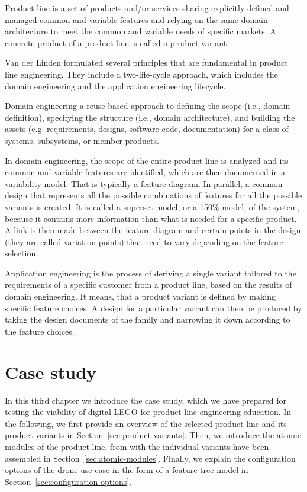 \documentclass[sigconf,review]{acmart}
\begin{document}
Product line is a set of products and/or services sharing explicitly defined and managed common and variable features and relying on the same domain architecture to meet the common and variable needs of specific markets.
A concrete product of a product line is called a product variant.

Van der Linden formulated several principles that are fundamental in product line engineering. They include a two-life-cycle approach, which includes the domain engineering and the application engineering lifecycle.

Domain engineering a reuse-based approach to defining the scope (i.e., domain definition), specifying the structure (i.e., domain architecture), and building the assets (e.g. requirements, designs, software code, documentation) for a class of systems, subsystems, or member products.

In domain engineering, the scope of the entire product line is analyzed and its common and variable features are identified, which are then documented in a variability model. That is typically a feature diagram.
In parallel, a common design that represents all the possible combinations of features for all the possible variants is created. It is called a superset model, or a 150\% model, of the system, because it contains more information than what is needed for a specific product.
A link is then made between the feature diagram and certain points in the design (they are called variation points) that need to vary depending on the feature selection.

Application engineering is the process of deriving a single variant tailored to the requirements of a specific customer from a product line, based on the results of domain engineering. 
It means, that a product variant is defined by making specific feature choices. A design for a particular variant can then be produced by taking the design documents of the family and narrowing it down according to the feature choices.


\section{Case study}
\label{sec:case-study}

In this third chapter we introduce the case study, which we have prepared for testing the viability of digital LEGO for product line engineering education.
In the following, we first provide an overview of the selected product line and its product variants in Section~\ref{sec:product-variants}.
Then, we introduce the atomic modules of the product line, from with the individual variants have been assembled in Section~\ref{sec:atomic-modules}.
Finally, we explain the configuration options of the drone use case in the form of a feature tree model in Section~\ref{sec:configuration-options}.
\end{document}
